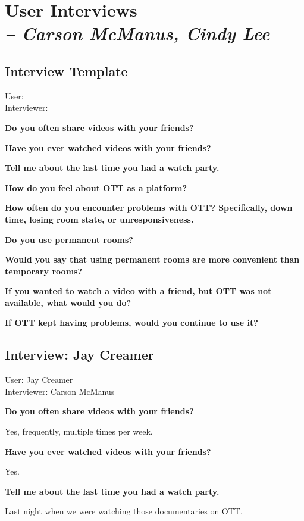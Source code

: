 \chapter{User Interviews \\
  \small{\textit{-- Carson McManus, Cindy Lee}}
  \label{Chapter::UserInterviews}}


\section{Interview Template}

User: \\
Interviewer:

\textbf{Do you often share videos with your friends?}

\textbf{Have you ever watched videos with your friends?}

\textbf{Tell me about the last time you had a watch party.}

\textbf{How do you feel about OTT as a platform?}

\textbf{How often do you encounter problems with OTT? Specifically, down time, losing room state, or unresponsiveness.}

\textbf{Do you use permanent rooms?}

\textbf{Would you say that using permanent rooms are more convenient than temporary rooms?}

\textbf{If you wanted to watch a video with a friend, but OTT was not available, what would you do?}

\textbf{If OTT kept having problems, would you continue to use it?}


\section{Interview: Jay Creamer}

User: Jay Creamer \\
Interviewer: Carson McManus

\textbf{Do you often share videos with your friends?}

Yes, frequently, multiple times per week.

\textbf{Have you ever watched videos with your friends?}

Yes.

\textbf{Tell me about the last time you had a watch party.}

Last night when we were watching those documentaries on OTT.

